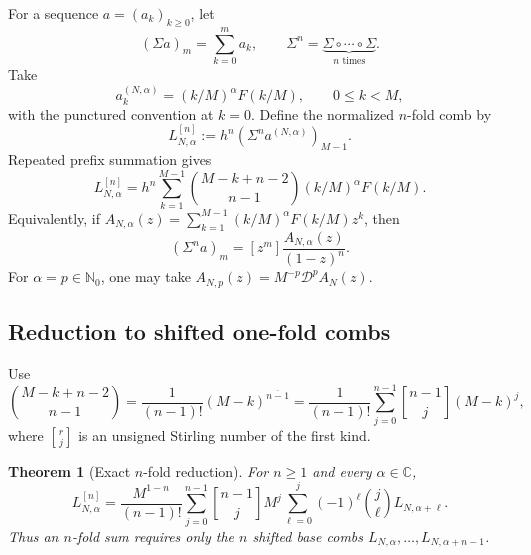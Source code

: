 \documentclass[11pt,oneside]{article}
\numberwithin{equation}{section}
\newtheorem{theorem}{Theorem}[section]
\theoremstyle{definition}
\theoremstyle{remark}
\newcommand{\C}{\mathbb C}
\newcommand{\N}{\mathbb N}
\newcommand{\rise}[2]{#1^{\overline{#2}}}
\newcommand{\Dop}{\mathcal D}
\newcommand{\stirlingfirst}[2]{\genfrac{[}{]}{0pt}{}{#1}{#2}}
\begin{document}
For a sequence \(a=(a_k)_{k\ge0}\), let
\begin{equation}
 (\Sigma a)_m=\sum_{k=0}^{m}a_k,
 \qquad
 \Sigma^n=\underbrace{\Sigma\circ\cdots\circ\Sigma}_{n\text{ times}}.
 \label{eq:Sigma}
\end{equation}
Take
\begin{equation}
 a_k^{(N,\alpha)}=(k/M)^\alpha F(k/M),
 \qquad 0\le k<M,
 \label{eq:ak}
\end{equation}
with the punctured convention at \(k=0\).  Define the normalized \(n\)-fold comb by
\begin{equation}
 L_{N,\alpha}^{[n]}
 :=h^n(\Sigma^na^{(N,\alpha)})_{M-1}.
 \label{eq:Ln-iter-def}
\end{equation}
Repeated prefix summation gives
\begin{equation}
 \boxed{\displaystyle
 L_{N,\alpha}^{[n]}
 =h^n\sum_{k=1}^{M-1}
 \binom{M-k+n-2}{n-1}(k/M)^\alpha F(k/M).}
 \label{eq:iter-binomial}
\end{equation}
Equivalently, if
\(A_{N,\alpha}(z)=\sum_{k=1}^{M-1}(k/M)^\alpha F(k/M)z^k\), then
\begin{equation}
 (\Sigma^na)_m=[z^m]\frac{A_{N,\alpha}(z)}{(1-z)^n}.
 \label{eq:iter-gf}
\end{equation}
For \(\alpha=p\in\N_0\), one may take
\(A_{N,p}(z)=M^{-p}\Dop^pA_N(z)\).

\subsection{Reduction to shifted one-fold combs}

Use
\begin{equation}
 \binom{M-k+n-2}{n-1}
 =\frac1{(n-1)!}\rise{(M-k)}{n-1}
 =\frac1{(n-1)!}
 \sum_{j=0}^{n-1}\stirlingfirst{n-1}{j}(M-k)^j,
 \label{eq:rising-Stirling}
\end{equation}
where \(\stirlingfirst{r}{j}\) is an unsigned Stirling number of the first kind.

\begin{theorem}[Exact \(n\)-fold reduction]
\label{thm:iterated-reduction}
For \(n\ge1\) and every \(\alpha\in\C\),
\begin{equation}
 \boxed{\displaystyle
 L_{N,\alpha}^{[n]}
 =\frac{M^{1-n}}{(n-1)!}
 \sum_{j=0}^{n-1}\stirlingfirst{n-1}{j}M^j
 \sum_{\ell=0}^{j}(-1)^\ell\binom j\ell
 L_{N,\alpha+\ell}.}
 \label{eq:iterated-reduction}
\end{equation}
Thus an \(n\)-fold sum requires only the \(n\) shifted base combs
\(L_{N,\alpha},\ldots,L_{N,\alpha+n-1}\).
\end{theorem}
\end{document}
